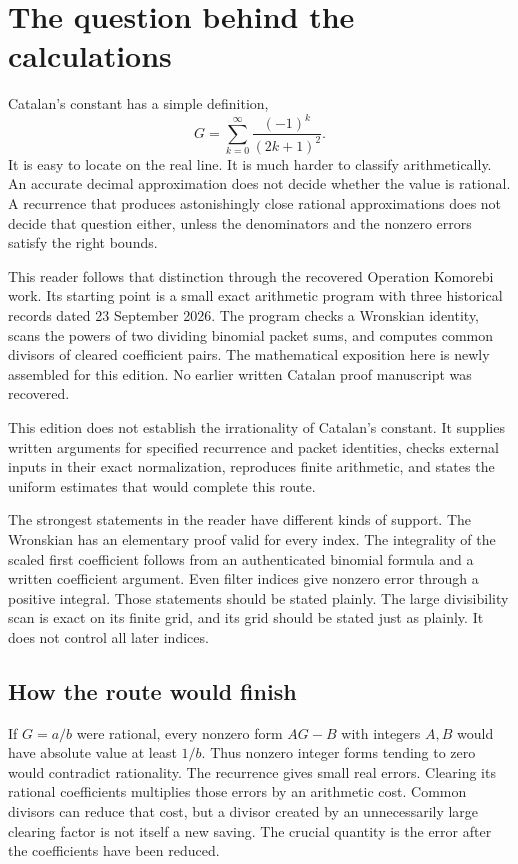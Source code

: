 \chapter*{The question behind the calculations}
Catalan's constant has a simple definition,
\[
G=\sum_{k=0}^{\infty}\frac{(-1)^k}{(2k+1)^2}.
\]
It is easy to locate on the real line. It is much harder to classify arithmetically. An accurate decimal approximation does not decide whether the value is rational. A recurrence that produces astonishingly close rational approximations does not decide that question either, unless the denominators and the nonzero errors satisfy the right bounds.

This reader follows that distinction through the recovered Operation Komorebi work. Its starting point is a small exact arithmetic program with three historical records dated 23 September 2026. The program checks a Wronskian identity, scans the powers of two dividing binomial packet sums, and computes common divisors of cleared coefficient pairs. The mathematical exposition here is newly assembled for this edition. No earlier written Catalan proof manuscript was recovered.

\begin{claimboundary}
This edition does not establish the irrationality of Catalan's constant. It supplies written arguments for specified recurrence and packet identities, checks external inputs in their exact normalization, reproduces finite arithmetic, and states the uniform estimates that would complete this route.
\end{claimboundary}

The strongest statements in the reader have different kinds of support. The Wronskian has an elementary proof valid for every index. The integrality of the scaled first coefficient follows from an authenticated binomial formula and a written coefficient argument. Even filter indices give nonzero error through a positive integral. Those statements should be stated plainly. The large divisibility scan is exact on its finite grid, and its grid should be stated just as plainly. It does not control all later indices.

\section*{How the route would finish}
If $G=a/b$ were rational, every nonzero form $AG-B$ with integers $A,B$ would have absolute value at least $1/b$. Thus nonzero integer forms tending to zero would contradict rationality. The recurrence gives small real errors. Clearing its rational coefficients multiplies those errors by an arithmetic cost. Common divisors can reduce that cost, but a divisor created by an unnecessarily large clearing factor is not itself a new saving. The crucial quantity is the error after the coefficients have been reduced.

